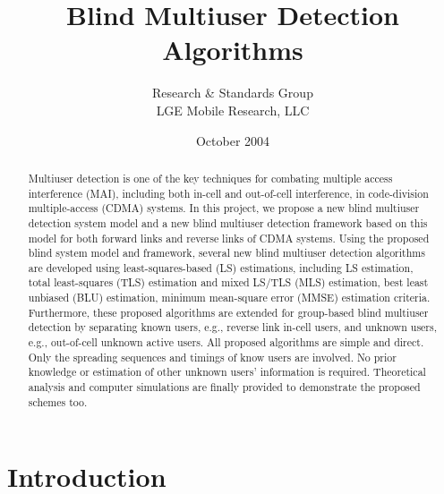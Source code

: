\documentclass[a4paper,11pt,fleqn]{article}
\title{Blind Multiuser Detection Algorithms}
\author{Research \& Standards Group\\ LGE Mobile Research, LLC}
\date{October 2004}
\begin{document}
\maketitle

\pagebreak

\tableofcontents

\pagebreak

\listoffigures

\pagebreak


\begin{abstract}
Multiuser detection is one of the key techniques for combating
multiple access interference (MAI), including both in-cell and
out-of-cell interference, in code-division multiple-access (CDMA)
systems. In this project, we propose a new blind multiuser
detection system model and a new blind multiuser detection
framework based on this model for both forward links and reverse
links of CDMA systems. Using the proposed blind system model and
framework, several new blind multiuser detection algorithms are
developed using least-squares-based (LS) estimations, including LS
estimation, total least-squares (TLS) estimation and mixed LS/TLS
(MLS) estimation, best least unbiased (BLU) estimation, minimum
mean-square error (MMSE) estimation criteria. Furthermore, these
proposed algorithms are extended for group-based blind multiuser
detection by separating known users, e.g., reverse link in-cell
users, and unknown users, e.g., out-of-cell unknown active users.
All proposed algorithms are simple and direct. Only the spreading
sequences and timings of know users are involved. No prior
knowledge or estimation of other unknown users' information is
required. Theoretical analysis and computer simulations are
finally provided to demonstrate the proposed schemes too.
\end{abstract}

\pagebreak

\section{Introduction}
\end{document}
